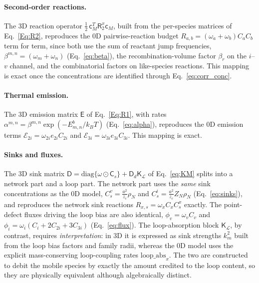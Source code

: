 \documentclass{article}
\newcommand{\spvec}[1]{\bm{\mathsf{#1}}}   %
\newcommand{\spmat}[1]{\bm{\mathsf{#1}}}   %
\begin{document}
\paragraph{Second-order reactions.} The 3D reaction operator $\tfrac12\,\spvec{c}_M^{T}\spmat{R}_2^{x}\spvec{c}_M$, built from the per-species matrices of Eq.~\eqref{Eq:R2}, reproduces the 0D pairwise-reaction budget $R_{a,b}=(\omega_a+\omega_b)C_aC_b$ term for term, since both use the sum of reactant jump frequencies, $\beta^{m,n}=(\omega_m+\omega_n)$ (Eq.~\eqref{eq:beta}), the recombination-volume factor $\beta_r$ on the $i$--$v$ channel, and the combinatorial factors on like-species reactions. This mapping is exact once the concentrations are identified through Eq.~\eqref{eq:corr_conc}.

\paragraph{Thermal emission.} The 3D emission matrix $\spmat{E}$ of Eq.~\eqref{Eq:R1}, with rates $\alpha^{m,n}=\beta^{m,n}\exp(-E^b_{m,n}/k_BT)$ (Eq.~\eqref{eq:alpha}), reproduces the 0D emission terms $\mathcal E_{2i}=\omega_{2i}e_{2i}C_{2i}$ and $\mathcal E_{3i}=\omega_{3i}e_{3i}C_{3i}$. This mapping is exact.

\paragraph{Sinks and fluxes.} The 3D sink matrix $\spmat{D}=\mathrm{diag}\{\spvec\omega\odot\spvec C_s\}+\spmat{D}_d\spmat{K}_{\mathcal L}$ of Eq.~\eqref{eq:KM} splits into a network part and a loop part. The network part uses the \emph{same} sink concentrations as the 0D model, $C_s^v=\tfrac{a^2}{z_c}\rho_N$ and $C_s^i=\tfrac{a^2}{z_c}Z_N\rho_N$ (Eq.~\eqref{eq:sinks}), and reproduces the network sink reactions $R_{x,s}=\omega_x C_x C_s^x$ exactly. The point-defect fluxes driving the loop bias are also identical, $\phi_v=\omega_v C_v$ and $\phi_i=\omega_i(C_i+2C_{2i}+3C_{3i})$ (Eq.~\eqref{eq:flux}). The loop-absorption block $\spmat{K}_{\mathcal L}$, by contrast, requires \emph{interpretation}: in 3D it is expressed as sink strengths $k_m^2$ built from the loop bias factors and family radii, whereas the 0D model uses the explicit mass-conserving loop-coupling rates $\text{loop\_abs}_x$. The two are constructed to debit the mobile species by exactly the amount credited to the loop content, so they are physically equivalent although algebraically distinct.
\end{document}
